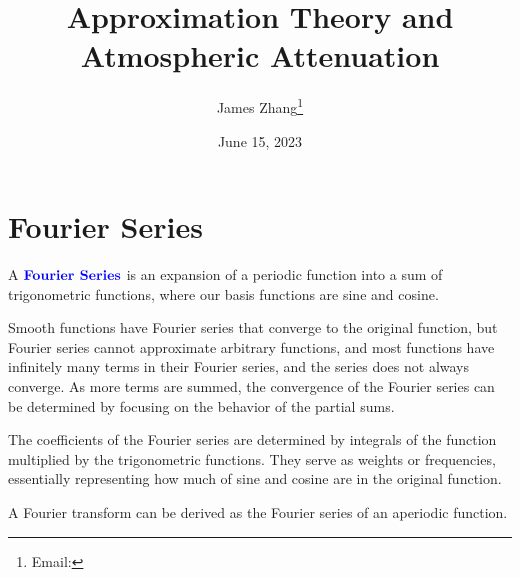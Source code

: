 \documentclass[12pt]{scrartcl}
\begin{document}
\title{Approximation Theory and Atmospheric Attenuation}
\author{James Zhang\thanks{Email: }}
\date{June 15, 2023}



\maketitle
\newpage

\tableofcontents

\newpage

\section{Fourier Series}

\begin{definition}
    A $\textbf{\color{blue} Fourier Series}$ is an expansion of a periodic function into a sum of trigonometric functions, where our basis functions are sine and cosine.
\end{definition}

\begin{note}
    Smooth functions have Fourier series that converge to the original function, but Fourier series cannot approximate arbitrary functions, and most functions have infinitely many terms in their Fourier series, and the series does not always converge. As more terms are summed, the convergence of the Fourier series can be determined by focusing on the behavior of the partial sums.
\end{note}

\begin{note}
    The coefficients of the Fourier series are determined by integrals of the function multiplied by the trigonometric functions.
    They serve as weights or frequencies, essentially representing how much of sine and cosine are in the original function.
\end{note}

\begin{note}
    A Fourier transform can be derived as the Fourier series of an aperiodic function.
\end{note}
\end{document}
